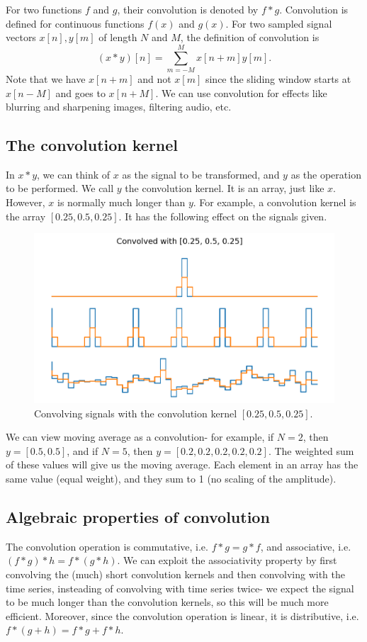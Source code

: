 \documentclass[a4paper, openany]{memoir}
\begin{document}
For two functions $f$ and $g$, their convolution is denoted by $f * g$. Convolution is defined for continuous functions $f(x)$ and $g(x)$. For two sampled signal vectors $x[n], y[m]$ of length $N$ and $M$, the definition of convolution is
\[(x * y)[n] = \sum_{m=-M}^M x[n+m] y[m].\]
Note that we have $x[n+m]$ and not $x[m]$ since the sliding window starts at $x[n-M]$ and goes to $x[n+M]$. We can use convolution for effects like blurring and sharpening images, filtering audio, etc.

\subsection{The convolution kernel}
In $x * y$, we can think of $x$ as the signal to be transformed, and $y$ as the operation to be performed. We call $y$ the convolution kernel. It is an array, just like $x$. However, $x$ is normally much longer than $y$. For example, a convolution kernel is the array $[0.25, 0.5, 0.25]$. It has the following effect on the signals given.
\begin{figure}[H]
    \centering
    \includegraphics[scale=0.6]{src/6.13 convolved .25 .5 .25.png}
    \caption{Convolving signals with the convolution kernel $[0.25, 0.5, 0.25]$.}
\end{figure}

We can view moving average as a convolution- for example, if $N = 2$, then $y = [0.5, 0.5]$, and if $N = 5$, then $y = [0.2, 0.2, 0.2, 0.2, 0.2]$. The weighted sum of these values will give us the moving average. Each element in an array has the same value (equal weight), and they sum to 1 (no scaling of the amplitude).

\subsection{Algebraic properties of convolution}
The convolution operation is commutative, i.e. $f * g = g * f$, and associative, i.e. $(f * g) * h = f * (g * h)$. We can exploit the associativity property by first convolving the (much) short convolution kernels and then convolving with the time series, insteading of convolving with time series twice- we expect the signal to be much longer than the convolution kernels, so this will be much more efficient. Moreover, since the convolution operation is linear, it is distributive, i.e. $f * (g + h) = f * g + f * h$.
\end{document}
